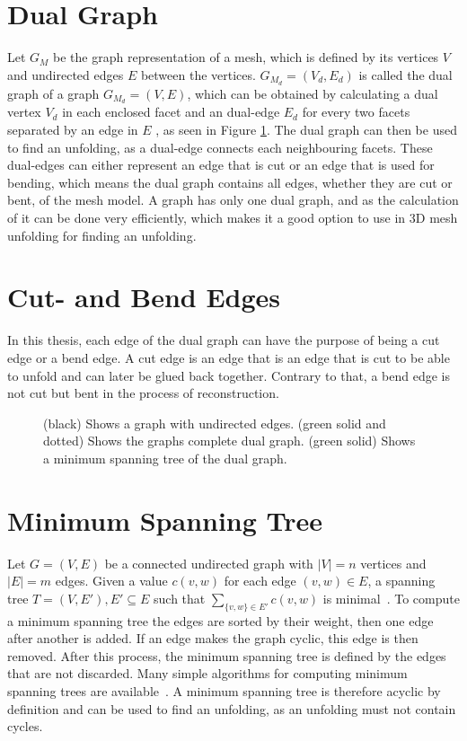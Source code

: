 \documentclass[draft,final]{vutinfth} %
\begin{document}
\section{Dual Graph}
Let $G_M$ be the graph representation of a mesh, which is defined by its vertices $V$ and undirected edges $E$ between the vertices. $G_{M_d} = (V_d, E_d)$ is called the dual graph of a graph $G_{M_d} = (V,E)$, which can be obtained by calculating a dual vertex $V_d$ in each enclosed facet and an dual-edge $E_d$ for every two facets separated by an edge in $E$ \cite{gross2004handbook}, as seen in Figure \ref{fig:dualgraph}. The dual graph can then be used to find an unfolding, as a dual-edge connects each neighbouring facets. These dual-edges can either represent an edge that is cut or an edge that is used for bending, which means the dual graph contains all edges, whether they are cut or bent, of the mesh model. A graph has only one dual graph, and as the calculation of it can be done very efficiently, which makes it a good option to use in 3D mesh unfolding for finding an unfolding.

\section{Cut- and Bend Edges}
In this thesis, each edge of the dual graph can have the purpose of being a cut edge or a bend edge. A cut edge is an edge that is an edge that is cut to be able to unfold and can later be glued back together. Contrary to that, a bend edge is not cut but bent in the process of reconstruction.

\begin{figure}

\caption{(black) Shows a graph with undirected edges. (green solid and dotted) Shows the graphs complete dual graph. (green solid) Shows a minimum spanning tree of the dual graph.}
\label{fig:dualgraph}
\end{figure}

\section{Minimum Spanning Tree}
Let $G = (V,E)$ be a connected undirected graph with $|V| = n$ vertices and $|E| = m$ edges. Given a value $c(v,w)$ for each edge $(v,w) \in E$, a spanning tree $T = (V,E'), E' \subseteq E$ such that $\sum_{\{v,w\}\in E'} c(v,w)$ is minimal~\cite{cheriton1976finding}. To compute a minimum spanning tree the edges are sorted by their weight, then one edge after another is added. If an edge makes the graph cyclic, this edge is then removed. After this process, the minimum spanning tree is defined by the edges that are not discarded. Many simple algorithms for computing minimum spanning trees are available~\cite{kruskal1956shortest,ahuja1990faster}. A minimum spanning tree is therefore acyclic by definition and can be used to find an unfolding, as an unfolding must not contain cycles. 
\end{document}

